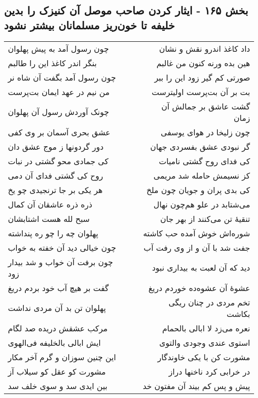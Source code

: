 \begin{center}
\section*{بخش ۱۶۵ - ایثار کردن صاحب موصل آن کنیزک را بدین خلیفه تا خون‌ریز مسلمانان بیشتر نشود}
\label{sec:sh165}
\begin{longtable}{l p{0.5cm} r}
چون رسول آمد به پیش پهلوان
&&
داد کاغذ اندرو نقش و نشان
\\
بنگر اندر کاغذ این را طالبم
&&
هین بده ورنه کنون من غالبم
\\
چون رسول آمد بگفت آن شاه نر
&&
صورتی کم گیر زود این را ببر
\\
من نیم در عهد ایمان بت‌پرست
&&
بت بر آن بت‌پرست اولیترست
\\
چونک آوردش رسول آن پهلوان
&&
گشت عاشق بر جمالش آن زمان
\\
عشق بحری آسمان بر وی کفی
&&
چون زلیخا در هوای یوسفی
\\
دور گردونها ز موج عشق دان
&&
گر نبودی عشق بفسردی جهان
\\
کی جمادی محو گشتی در نبات
&&
کی فدای روح گشتی نامیات
\\
روح کی گشتی فدای آن دمی
&&
کز نسیمش حامله شد مریمی
\\
هر یکی بر جا ترنجیدی چو یخ
&&
کی بدی پران و جویان چون ملخ
\\
ذره ذره عاشقان آن کمال
&&
می‌شتابد در علو هم‌چون نهال
\\
سبح لله هست اشتابشان
&&
تنقیهٔ تن می‌کنند از بهر جان
\\
پهلوان چه را چو ره پنداشته
&&
شوره‌اش خوش آمده حب کاشته
\\
چون خیالی دید آن خفته به خواب
&&
جفت شد با آن و از وی رفت آب
\\
چون برفت آن خواب و شد بیدار زود
&&
دید که آن لعبت به بیداری نبود
\\
گفت بر هیچ آب خود بردم دریغ
&&
عشوهٔ آن عشوه‌ده خوردم دریغ
\\
پهلوان تن بد آن مردی نداشت
&&
تخم مردی در چنان ریگی بکاشت
\\
مرکب عشقش دریده صد لگام
&&
نعره می‌زد لا ابالی بالحمام
\\
ایش ابالی بالخلیفه فی‌الهوی
&&
استوی عندی وجودی والتوی
\\
این چنین سوزان و گرم آخر مکار
&&
مشورت کن با یکی خاوندگار
\\
مشورت کو عقل کو سیلاب آز
&&
در خرابی کرد ناخنها دراز
\\
بین ایدی سد و سوی خلف سد
&&
پیش و پس کم بیند آن مفتون خد
\\

\end{longtable}
\end{center}

